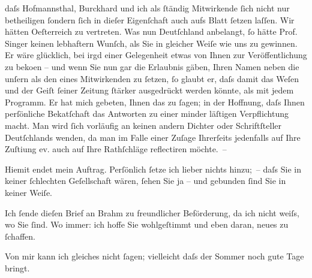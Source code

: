                daſs Hof{\pb}mannsthal, Burckhard und ich als{ }ſtändig Mitwirkende{ }ſich nicht nur betheiligen{ }ſondern{ }ſich in dieſer Eigenſchaft
               auch aufs Blatt{ }ſetzen laſſen. Wir hätten Oeſterreich zu vertreten. Was nun Deutſchland anbelangt,{ }ſo hätte Prof. Singer keinen lebhaftern Wunſch, als Sie {\pb}in gleicher Weiſe wie uns zu gewinnen. Er wäre
               glücklich, bei irgd einer Gelegenheit etwas von Ihnen zur Veröffentlichung zu beko{\geminationm}en – und wenn Sie nun gar die Erlaubnis gäben, Ihren
               Namen neben die unſern als den eines Mitwirkenden zu{ }ſetzen,{ }ſo glaubt er, daſs damit
               das Weſen und der Geiſt{ }ſeiner Zeitung{ }ſtärker {\pb}ausgedrückt werden könnte, als mit jedem Programm. Er hat mich gebeten, Ihnen das
               zu{ }ſagen; in der Hoffnung, daſs Ihnen perſönliche Beka{\geminationn}tſchaft das Antworten zu einer minder läſtigen Verpflichtung macht. Man wird{ }ſich
               vorläufig an keinen andern Dichter oder Schriftſteller Deutſch{\pb}lands wenden, da man im
               Falle einer Zuſage Ihrerſeits jedenfalls auf Ihre Zuſti{\geminationm}ung ev. auch auf Ihre Rathſchläge reflectiren möchte. –\pend
           
\pstart
           Hiemit endet mein Auftrag. Perſönlich{ }ſetze ich lieber nichts hinzu; – daſs Sie in
               keiner{ }ſchlechten Geſellschaft wären,{ }ſehen Sie ja – und gebunden{ }ſind {\pb}Sie in keiner Weiſe.\pend
           
\pstart
           Ich{ }ſende dieſen Brief an Brahm zu
               freundlicher Beförderung, da ich nicht weiſs, wo Sie{ }ſind. Wo immer: ich hoffe Sie
               wohlgeſtimmt und eben daran, neues zu{ }ſchaffen.\pend
           
\pstart
           Von mir kann ich gleiches nicht{ }ſagen; vielleicht daſs der Sommer noch gute Tage bringt.\pend
           
